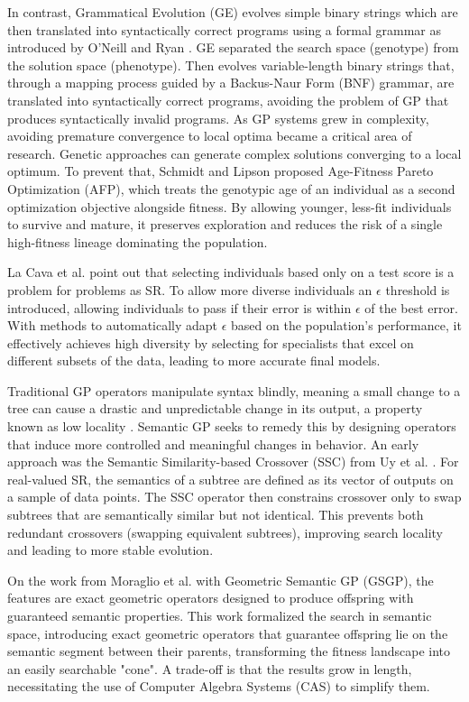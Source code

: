 In contrast, Grammatical Evolution (GE) evolves simple binary strings which are then translated into syntactically correct programs using a formal grammar as introduced by O'Neill and Ryan \cite{oneill_grammatical_2003}. GE separated the search space (genotype) from the solution space (phenotype). Then evolves variable-length binary strings that, through a mapping process guided by a Backus-Naur Form (BNF) grammar, are translated into syntactically correct programs, avoiding the problem of GP that produces syntactically invalid programs. As GP systems grew in complexity, avoiding premature convergence to local optima became a critical area of research. Genetic approaches can generate complex solutions converging to a local optimum. To prevent that, Schmidt and Lipson \cite{schmidt2011age} proposed Age-Fitness Pareto Optimization (AFP), which treats the genotypic age of an individual as a second optimization objective alongside fitness. By allowing younger, less-fit individuals to survive and mature, it preserves exploration and reduces the risk of a single high-fitness lineage dominating the population. 

La Cava et al. \cite{cava_epsilon-lexicase_2016} point out that selecting individuals based only on a test score is a problem for problems as SR. To allow more diverse individuals an $\epsilon$ threshold is introduced, allowing individuals to pass if their error is within $\epsilon$ of the best error. With methods to automatically adapt $\epsilon$ based on the population's performance, it effectively achieves high diversity by selecting for specialists that excel on different subsets of the data, leading to more accurate final models.

Traditional GP operators manipulate syntax blindly, meaning a small change to a tree can cause a drastic and unpredictable change in its output, a property known as low locality \cite{uy_semantically-based_2011}. Semantic GP seeks to remedy this by designing operators that induce more controlled and meaningful changes in behavior. An early approach was the Semantic Similarity-based Crossover (SSC) from Uy et al. \cite{uy_semantically-based_2011}. For real-valued SR, the semantics of a subtree are defined as its vector of outputs on a sample of data points. The SSC operator then constrains crossover only to swap subtrees that are semantically similar but not identical. This prevents both redundant crossovers (swapping equivalent subtrees), improving search locality and leading to more stable evolution.

On the work from Moraglio et al. \cite{moraglio2012gsgp} with Geometric Semantic GP (GSGP), the features are exact geometric operators designed to produce offspring with guaranteed semantic properties. This work formalized the search in semantic space, introducing exact geometric operators that guarantee offspring lie on the semantic segment between their parents, transforming the fitness landscape into an easily searchable "cone". A trade-off is that the results grow in length, necessitating the use of Computer Algebra Systems (CAS) to simplify them.

